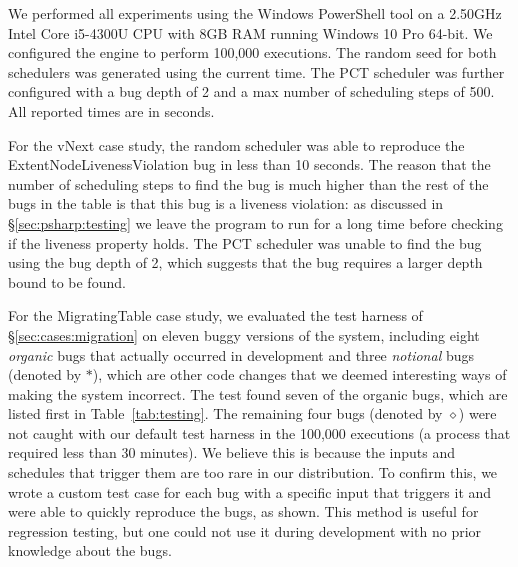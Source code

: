 We performed all experiments using the Windows PowerShell tool on a 2.50GHz Intel Core i5-4300U CPU with 8GB RAM running Windows 10 Pro 64-bit. We configured the engine to perform 100,000 executions. The random seed for both schedulers was generated using the current time. The PCT scheduler was further configured with a bug depth of 2 and a max number of scheduling steps of 500. All reported times are in seconds.

For the vNext case study, the random scheduler was able to reproduce the ExtentNodeLivenessViolation bug in less than 10 seconds. The reason that the number of scheduling steps to find the bug is much higher than the rest of the bugs in the table is that this bug is a liveness violation: as discussed in \S\ref{sec:psharp:testing} we leave the program to run for a long time before checking if the liveness property holds. The PCT scheduler was unable to find the bug using the bug depth of 2, which suggests that the bug requires a larger depth bound to be found.

For the MigratingTable case study, we evaluated the \psharp test harness of \S\ref{sec:cases:migration} on eleven buggy versions of the system, including eight \emph{organic} bugs that actually occurred in development and three \emph{notional} bugs (denoted by $*$), which are other code changes that we deemed interesting ways of making the system incorrect. The test found seven of the organic bugs, which are listed first in Table~\ref{tab:testing}. The remaining four bugs (denoted by $\diamond$) were not caught with our default test harness in the 100,000 executions (a process that required less than 30 minutes). We believe this is because the inputs and schedules that trigger them are too rare in our distribution. To confirm this, we wrote a custom test case for each bug with a specific input that triggers it and were able to quickly reproduce the bugs, as shown. This method is useful for regression testing, but one could not use it during development with no prior knowledge about the bugs.

